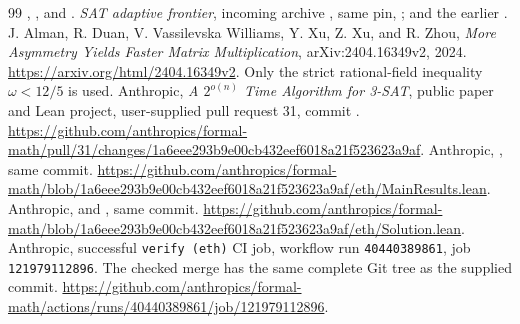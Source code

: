 \begin{thebibliography}{99}
, , and
.
 \emph{SAT adaptive frontier}, incoming archive
, same pin,
; and the earlier
.
 J. Alman, R. Duan, V. Vassilevska Williams, Y. Xu, Z. Xu,
and R. Zhou, \emph{More Asymmetry Yields Faster Matrix Multiplication},
arXiv:2404.16349v2, 2024.
\url{https://arxiv.org/html/2404.16349v2}.
Only the strict rational-field inequality $\omega<12/5$ is used.
 Anthropic, \emph{A $2^{o(n)}$ Time Algorithm for 3-SAT},
public paper and Lean project, user-supplied pull request 31, commit
\anthpin.
\url{https://github.com/anthropics/formal-math/pull/31/changes/1a6eee293b9e00cb432eef6018a21f523623a9af}.
 Anthropic, , same commit.
\url{https://github.com/anthropics/formal-math/blob/1a6eee293b9e00cb432eef6018a21f523623a9af/eth/MainResults.lean}.
 Anthropic,  and
, same commit.
\url{https://github.com/anthropics/formal-math/blob/1a6eee293b9e00cb432eef6018a21f523623a9af/eth/Solution.lean}.
 Anthropic, successful \texttt{verify (eth)} CI job,
workflow run \texttt{40440389861}, job \texttt{121979112896}.
The checked merge has the same complete Git tree as the supplied commit.
\url{https://github.com/anthropics/formal-math/actions/runs/40440389861/job/121979112896}.
\end{thebibliography}
